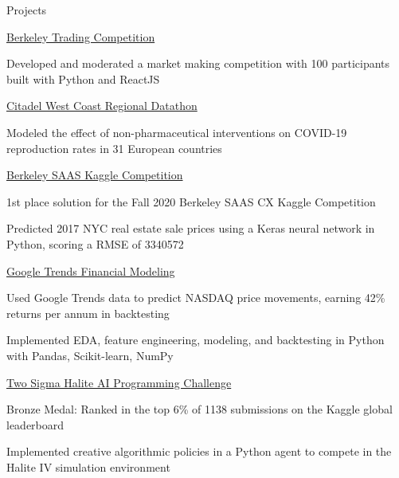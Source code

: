 \documentclass{resume} %
\begin{document}
\begin{rSection}{Projects}

\begin{rSubsection}{\href{https://traders.berkeley.edu/}{Berkeley Trading Competition}}{}{}{}
    \item Developed and moderated a market making competition with 100 participants built with Python and ReactJS 
\end{rSubsection}

\begin{rSubsection}{\href{https://github.com/evilpegasus/datathon-spring-2021}{Citadel West Coast Regional Datathon}}{}{}{}
    \item Modeled the effect of non-pharmaceutical interventions on COVID-19 reproduction rates in 31 European countries
\end{rSubsection}

\begin{rSubsection}{\href{https://www.kaggle.com/c/saas-2020-fall-cx-kaggle-compeition/}{Berkeley SAAS Kaggle Competition}}{}{}{}
    \item 1st place solution for the Fall 2020 Berkeley SAAS CX Kaggle Competition
    \item Predicted 2017 NYC real estate sale prices using a Keras neural network in Python, scoring a RMSE of 3340572
\end{rSubsection}

\begin{rSubsection}{\href{https://github.com/evilpegasus/google-trends-financial-modeling/}{Google Trends Financial Modeling}}{}{}{}
    \item Used Google Trends data to predict NASDAQ price movements, earning 42\% returns per annum in backtesting
    \item Implemented EDA, feature engineering, modeling, and backtesting in Python with Pandas, Scikit-learn, NumPy
\end{rSubsection}

\begin{rSubsection}{\href{https://www.kaggle.com/c/halite/}{Two Sigma Halite AI Programming Challenge}}{}{}{}
    \item Bronze Medal: Ranked in the top 6\% of 1138 submissions on the Kaggle global leaderboard
    \item Implemented creative algorithmic policies in a Python agent to compete in the Halite IV simulation environment
\end{rSubsection}


\end{rSection}
\end{document}
